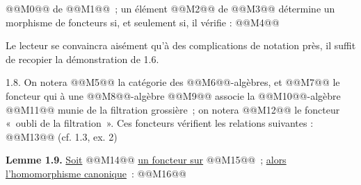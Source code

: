 
@@M0@@ de @@M1@@~; un
élément @@M2@@ de @@M3@@ détermine un morphisme de foncteurs si, et seulement si, il vérifie :
@@M4@@

Le lecteur se convaincra aisément qu'à des complications de notation près, il suffit de recopier la démonstration de 1.6.

1.8. On notera @@M5@@ la catégorie des @@M6@@-algèbres, et
@@M7@@
le foncteur qui à une @@M8@@-algèbre @@M9@@ associe la @@M10@@-algèbre @@M11@@ munie de la filtration grossière~; on notera
@@M12@@
le foncteur «~oubli de la filtration~». Ces foncteurs vérifient les relations suivantes :
@@M13@@
(cf. 1.3, ex. 2)

\textbf{Lemme 1.9.} \uline{Soit} @@M14@@ \uline{un foncteur sur} @@M15@@~; \uline{alors l'homomorphisme canonique}~:
@@M16@@

